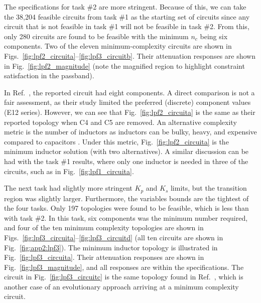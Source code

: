 

The specifications for task \#2 are more stringent.
Because of this, we can take the 38,204 feasible circuits from task \#1 as the starting set of circuits since any circuit that is not feasible in task \#1 will not be feasible in task \#2.
From this, only 280 circuits are found to be feasible with the minimum $n_c$ being six components.
Two of the eleven minimum-complexity circuits are shown in Figs.~\ref{fig:lpf2_circuita}--\ref{fig:lpf3_circuitb}.
Their attenuation responses are shown in Fig.~\ref{fig:lpf2_magnitude} (note the magnified region to highlight constraint satisfaction in the passband).

In Ref.~\cite{Gan2010a}, the reported circuit had eight components.
A direct comparison is not a fair assessment, as their study limited the preferred (discrete) component values (E12 series).
However, we can see that Fig.~\ref{fig:lpf2_circuita} is the same as their reported topology when \textsf{C4} and \textsf{C5} are removed.
An alternative complexity metric is the number of inductors as inductors can be bulky, heavy, and expensive compared to capacitors \cite{Wanhammar2009a}.
Under this metric, Fig.~\ref{fig:lpf2_circuita} is the minimum inductor solution (with two alternatives).
A similar discussion can be had with the task \#1 results, where only one inductor is needed in three of the circuits, such as in Fig.~\ref{fig:lpf1_circuita}.



The next task had slightly more stringent $K_p$ and $K_s$ limits, but the transition region was slightly larger.
Furthermore, the variables bounds are the tightest of the four tasks.
Only 197 topologies were found to be feasible, which is less than with task \#2. 
In this task, six components was the minimum number required, and four of the ten minimum complexity topologies are shown in Figs.~\ref{fig:lpf3_circuita}--\ref{fig:lpf3_circuitd} (all ten circuits are shown in Fig.~\ref{fig:app2:lpf3}). The minimum inductor topology is illustrated in Fig.~\ref{fig:lpf3_circuita}. 
Their attenuation responses are shown in Fig.~\ref{fig:lpf3_magnitude}, and all responses are within the specifications.
The circuit in Fig.~\ref{fig:lpf3_circuitc} is the same topology found in Ref.~\cite{Das2007a}, which is another case of an evolutionary approach arriving at a minimum complexity circuit.



